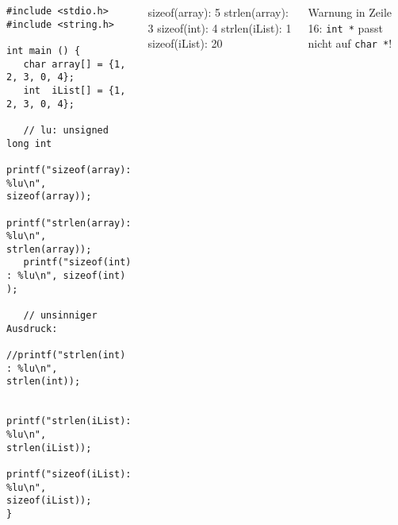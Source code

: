 \begin{frame}[fragile]
%
\begin{columns}[T]
\begin{codebox}
\begin{verbatim}
#include <stdio.h>
#include <string.h>

int main () {
   char array[] = {1, 2, 3, 0, 4};
   int  iList[] = {1, 2, 3, 0, 4};
   
   // lu: unsigned long int
   printf("sizeof(array): %lu\n", sizeof(array));
   printf("strlen(array): %lu\n", strlen(array));
   printf("sizeof(int)  : %lu\n", sizeof(int)  );

   // unsinniger Ausdruck:
   //printf("strlen(int)  : %lu\n", strlen(int));
	
   printf("strlen(iList): %lu\n", strlen(iList));
   printf("sizeof(iList): %lu\n", sizeof(iList));
}
\end{verbatim}
\end{codebox}
%
\begin{cmdbox}[Ausgabe]
\ttfamily \scriptsize
sizeof(array): 5\newline
strlen(array): 3\newline
sizeof(int)\quad: 4\newline
strlen(iList): 1\newline
sizeof(iList): 20\newline
\end{cmdbox}
%
\begin{warnbox}
Warnung in Zeile 16:\newline
\texttt{int *} passt nicht auf\newline
\texttt{char *}!
\end{warnbox}
%
\end{columns}
%
\end{frame}


